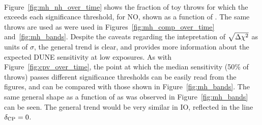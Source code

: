 \begin{figure*}[htbp]
  \centering
  \\
  \caption{Fraction of throws for which the DUNE sensitivity to the mass ordering exceeds 1--5$\sigma$ significance, as a function of the true value of \deltacp. Shown for NO, for a number of different exposures. The number of throws used to make each figure is also shown.}
  \label{fig:mh_nh_over_time}
\end{figure*}

Figure~\ref{fig:mh_nh_over_time} shows the fraction of toy throws for which the \dchisq exceeds each significance threshold, for NO, shown as a function of \deltacp. The same throws are used as were used in Figures~\ref{fig:mh_comp_over_time} and~\ref{fig:mh_bands}. Despite the caveats regarding the intepretation of $\sqrt{\Delta\chi^{2}}$ as units of $\sigma$, the general trend is clear, and provides more information about the expected DUNE sensitivity at low exposures. As with Figure~\ref{fig:cpv_over_time}, the point at which the median sensitivity (50\% of throws) passes different significance thresholds can be easily read from the figures, and can be compared with those shown in Figure~\ref{fig:mh_bands}. The same general shape as a function of \deltacp as was observed in Figure~\ref{fig:mh_bands} can be seen. The general trend would be very similar in IO, reflected in the line $\delta_{\rm CP} = 0$. 
